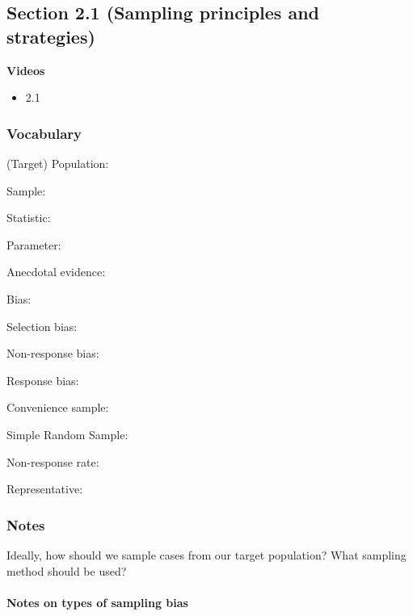 \documentclass[
]{report}
\providecommand{\tightlist}{%
  \setlength{\itemsep}{0pt}\setlength{\parskip}{0pt}}
\newcommand{\rgs}{\vspace{12pt}} %
\newcommand{\rgi}{\hspace{24pt}}  %
\begin{document}
\hypertarget{section-2.1-sampling-principles-and-strategies}{%
\subsection*{Section 2.1 (Sampling principles and strategies)}\label{section-2.1-sampling-principles-and-strategies}}

\textbf{Videos}

\begin{itemize}
\tightlist
\item
  2.1
\end{itemize}


\hypertarget{vocabulary-1}{%
\subsubsection*{Vocabulary}\label{vocabulary-1}}

(Target) Population:
\rgs

Sample:
\rgs

Statistic:
\rgs

Parameter:
\rgs

Anecdotal evidence:
\rgs

\newpage

Bias:
\rgs

\rgi Selection bias:
\rgs

\rgi Non-response bias:
\rgs

\rgi Response bias:
\rgs

Convenience sample:
\rgs

Simple Random Sample:
\rgs

Non-response rate:
\rgs

Representative:
\rgs

\hypertarget{notes-1}{%
\subsubsection*{Notes}\label{notes-1}}

Ideally, how should we sample cases from our target population? What sampling method should be used?
\rgs

\hypertarget{notes-on-types-of-sampling-bias}{%
\paragraph*{Notes on types of sampling bias}\label{notes-on-types-of-sampling-bias}}
\end{document}
